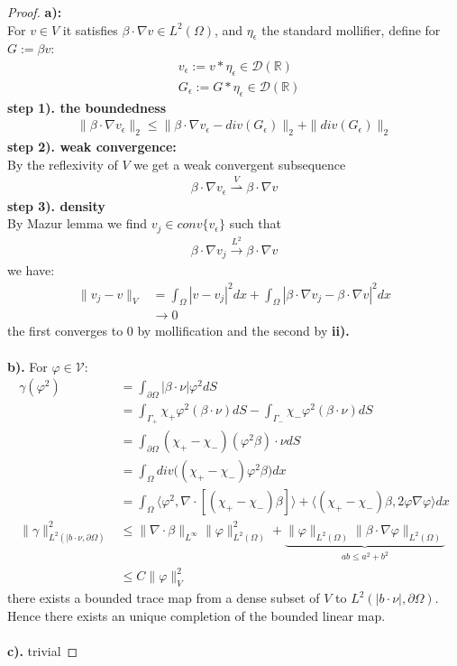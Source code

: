 \begin{proof}
\textbf{a):}\\
For $v \in V$ it satisfies $\beta \cdot \nabla v \in L^2(\Omega)$, and $\eta_\epsilon$ the standard mollifier, define for $G:= \beta v$:
\begin{align*}
	&v_\epsilon := v * \eta_\epsilon \in \mathcal{D}(\mathbb{R}) \\
	&G_\epsilon := G * \eta_\epsilon \in \mathcal{D}(\mathbb{R})
\end{align*}
\textbf{step 1). the boundedness}
\begin{align*}
	\|\beta \cdot \nabla v_\epsilon \|_2 \le \|\beta \cdot \nabla v_\epsilon - div(G_\epsilon)\|_2 + \|div(G_\epsilon)\|_2
\end{align*}
\textbf{step 2). weak convergence:}\\ By the reflexivity of $V$ we get a weak convergent subsequence 
\begin{align*}
	\beta \cdot \nabla v_\epsilon \overset{V}{\rightharpoonup} \beta \cdot \nabla v
\end{align*}
\textbf{step 3). density}\\ By Mazur lemma we find $v_j \in conv\{v_\epsilon\}$ such that 
\begin{align*}
	\beta \cdot \nabla v_j \overset{L^2}{\longrightarrow} \beta \cdot \nabla v
\end{align*}
we have:
\begin{align*}
	\|v_j - v\|_V 
	&= \int_\Omega |v - v_j|^2 dx + \int_\Omega |\beta \cdot \nabla v_j - \beta \cdot \nabla v|^2 dx \\
	&\rightarrow 0
\end{align*}
the first converges to 0 by mollification and the second by \textbf{ii).}\\
\quad\\
\textbf{b).} For $\varphi \in \mathcal{V}$:
\begin{align*}
	\gamma(\varphi^2) 
	&= \int_{\partial\Omega} |\beta \cdot \nu| \varphi^2 dS \\
	&= \int_{\Gamma_+} \chi_+ \varphi^2 (\beta \cdot \nu) dS - \int_{\Gamma_-}\chi_- \varphi^2 (\beta \cdot \nu)dS\\
	&= \int_{\partial\Omega}(\chi_+ - \chi_-) (\varphi^2 \beta) \cdot \nu dS\\
	&= \int_\Omega div\bigg((\chi_+ - \chi_-)\varphi^2 \beta\bigg) dx\\
	&= \int_\Omega \langle \varphi^2, \nabla \cdot [(\chi_+ - \chi_-)\beta]\rangle + \langle(\chi_+ - \chi_-)\beta, 2\varphi\nabla \varphi\rangle dx \\
	\|\gamma\|_{L^2(|b \cdot \nu, \partial\Omega)}^2
	&\le \|\nabla \cdot \beta\|_{L^\infty}\|\varphi\|^2_{L^2(\Omega)} +
	\underbrace{ \|\varphi\|_{L^2(\Omega)} \|\beta \cdot \nabla \varphi\|_{L^2(\Omega)}}_{ab \le a^2 + b^2}\\
	&\le C \|\varphi\|_V^2
\end{align*}
there exists a bounded trace map from a dense subset of $V$ to $L^2(|b\cdot \nu|,\partial\Omega)$. Hence there exists an unique completion of the bounded linear map.\\
\quad\\
\textbf{c).} trivial	
\end{proof}
